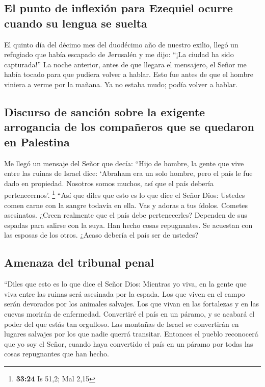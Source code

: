 \hypertarget{el-punto-de-inflexiuxf3n-para-ezequiel-ocurre-cuando-su-lengua-se-suelta}{%
\subsection{El punto de inflexión para Ezequiel ocurre cuando su lengua
se
suelta}\label{el-punto-de-inflexiuxf3n-para-ezequiel-ocurre-cuando-su-lengua-se-suelta}}

 El quinto día del décimo mes del duodécimo año de
nuestro exilio, llegó un refugiado que había escapado de Jerusalén y me
dijo: ``¡La ciudad ha sido capturada!''  La noche
anterior, antes de que llegara el mensajero, el Señor me había tocado
para que pudiera volver a hablar. Esto fue antes de que el hombre
viniera a verme por la mañana. Ya no estaba mudo; podía volver a hablar.

\hypertarget{discurso-de-sanciuxf3n-sobre-la-exigente-arrogancia-de-los-compauxf1eros-que-se-quedaron-en-palestina}{%
\subsection{Discurso de sanción sobre la exigente arrogancia de los
compañeros que se quedaron en
Palestina}\label{discurso-de-sanciuxf3n-sobre-la-exigente-arrogancia-de-los-compauxf1eros-que-se-quedaron-en-palestina}}

 Me llegó un mensaje del Señor que decía: 
``Hijo de hombre, la gente que vive entre las ruinas de Israel dice:
`Abraham era un solo hombre, pero el país le fue dado en propiedad.
Nosotros somos muchos, así que el país debería pertenecernos'.
\footnote{\textbf{33:24} Is 51,2; Mal 2,15}  ``Así que
diles que esto es lo que dice el Señor Dios: Ustedes comen carne con la
sangre todavía en ella. Vas y adoras a tus ídolos. Cometes asesinatos.
¿Creen realmente que el país debe pertenecerles? 
Dependen de sus espadas para salirse con la suya. Han hecho cosas
repugnantes. Se acuestan con las esposas de los otros. ¿Acaso debería el
país ser de ustedes?

\hypertarget{amenaza-del-tribunal-penal}{%
\subsection{Amenaza del tribunal
penal}\label{amenaza-del-tribunal-penal}}

 ``Diles que esto es lo que dice el Señor Dios: Mientras
yo viva, en la gente que viva entre las ruinas será asesinada por la
espada. Los que viven en el campo serán devorados por los animales
salvajes. Los que vivan en las fortalezas y en las cuevas morirán de
enfermedad.  Convertiré el país en un páramo, y se
acabará el poder del que estás tan orgulloso. Las montañas de Israel se
convertirán en lugares salvajes por los que nadie querrá transitar.
 Entonces el pueblo reconocerá que yo soy el Señor,
cuando haya convertido el país en un páramo por todas las cosas
repugnantes que han hecho.

